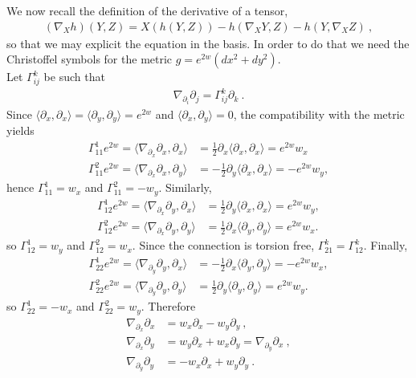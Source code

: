 \documentclass[a4paper,11pt,openright,twoside]{book}
\renewcommand{\Gamma}{\varGamma}
\newcommand{\1}{\mathds{1}}
\theoremstyle{plain}
\theoremstyle{definition}
\theoremstyle{remark}
\begin{document}
We now recall the definition of the derivative of a tensor,
\begin{align*}
	(\nabla_Xh)(Y,Z) = X(h(Y,Z))-h(\nabla_XY,Z)-h(Y,\nabla_XZ)
\ ,
\end{align*}
so that we may explicit the equation in the basis. In order to do that we need the Christoffel symbols for the metric $g=e^{2w}(dx^2+dy^2)$.\\
Let $\Gamma^k_{ij}$ be such that
\begin{align*}
\nabla_{\partial_i}\partial_j=\Gamma^k_{ij}\partial_k\ . 
\end{align*}
Since $\langle \partial_x,\partial_x\rangle=\langle \partial_y,\partial_y\rangle=e^{2w}$ and $\langle \partial_x,\partial_y\rangle=0$, the compatibility with the metric yields
\begin{align*}
\Gamma^1_{11}e^{2w}=\langle \nabla_{\partial_x}\partial_x,\partial_x\rangle
&=\frac12\partial_x\langle \partial_x,\partial_x\rangle=
e^{2w}w_x\\
\Gamma^2_{11}e^{2w}=
\langle \nabla_{\partial_x}\partial_x,\partial_y\rangle
&=-\frac12\partial_y\langle \partial_x,\partial_x\rangle
=-e^{2w}w_y,
\end{align*}
hence $\Gamma^1_{11}=w_x$ and $\Gamma^2_{11}=-w_y$. Similarly,
\begin{align*}
\Gamma^1_{12}e^{2w}=
\langle \nabla_{\partial_x}\partial_y,\partial_x\rangle
&=\frac12\partial_y\langle \partial_x,\partial_x\rangle
=e^{2w}w_y,\\
\Gamma^2_{12}e^{2w}=
\langle \nabla_{\partial_x}\partial_y,\partial_y\rangle
&=\frac12\partial_x\langle \partial_y,\partial_y\rangle
=e^{2w}w_x.
\end{align*}
so $\Gamma^1_{12}=w_y$ and $\Gamma^2_{12}=w_x$. Since the connection is torsion free, $\Gamma^k_{21}=\Gamma^k_{12}$. Finally,
\begin{align*}
\Gamma^1_{22}e^{2w}=
\langle \nabla_{\partial_y}\partial_y,\partial_x\rangle
&=-\frac12\partial_x\langle \partial_y,\partial_y\rangle
=-e^{2w}w_x,\\
\Gamma^2_{22}e^{2w}=
\langle \nabla_{\partial_y}\partial_y,\partial_y\rangle
&=\frac12\partial_y\langle \partial_y,\partial_y\rangle
=e^{2w}w_y.
\end{align*}
so $\Gamma^1_{22}=-w_x$ and $\Gamma^2_{22}=w_y$. Therefore
\begin{align*}
\nabla_{\partial_x}\partial_x&=w_x\partial_x-w_y\partial_y\ ,\\
\nabla_{\partial_x}\partial_y&=w_y\partial_x+w_x\partial_y=\nabla_{\partial_y}\partial_x\ ,\\
\nabla_{\partial_y}\partial_y&=-w_x\partial_x+w_y\partial_y\ .
\end{align*}
\end{document}
